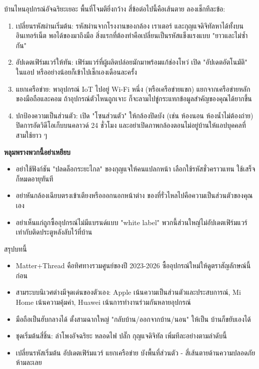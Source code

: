 
บ้านไหนอุปกรณ์อัจฉริยะเยอะ พื้นที่โจมตียิ่งกว้าง สี่ข้อต่อไปนี้คือเส้นตาย ลองเช็กทีละข้อ:

\begin{enumerate}
  \item เปลี่ยนรหัสผ่านเริ่มต้น: รหัสผ่านจากโรงงานของกล้อง เราเตอร์ และกุญแจดิจิทัลหาได้ทั้งบนอินเทอร์เน็ต พอได้ของมาถึงมือ สิ่งแรกที่ต้องทำคือเปลี่ยนเป็นรหัสแข็งแรงแบบ "ยาวและไม่ซ้ำกัน"
  \item อัปเดตเฟิร์มแวร์ให้ทัน: เฟิร์มแวร์ที่ผู้ผลิตปล่อยมักมาพร้อมแก้ช่องโหว่ เปิด "อัปเดตอัตโนมัติ" ในแอป หรืออย่างน้อยก็เข้าไปเช็กเองเดือนละครั้ง
  \item แยกเครือข่าย: พาอุปกรณ์ IoT ไปอยู่ Wi-Fi หนึ่ง (หรือเครือข่ายแขก) แยกจากเครือข่ายหลักของมือถือและคอม ถ้าอุปกรณ์ตัวไหนถูกเจาะ ก็จะลามไปขู่กระแทกข้อมูลสำคัญของคุณได้ยากขึ้น
  \item ปกป้องความเป็นส่วนตัว: เปิด "โซนส่วนตัว" ให้กล้องปิดบัง (เช่น ห้องนอน ห้องน้ำไม่ต้องถ่าย) ปิดการอัดวิดีโอเก็บบนคลาวด์ 24 ชั่วโมง และอย่าเปิดภาพกล้องตอนไม่อยู่บ้านให้แอปบุคคลที่สามใช้ยาว ๆ
\end{enumerate}

\textbf{หลุมพรางพวกนี้อย่าเหยียบ}\par

\begin{itemize}
  \item อย่าใช้ฟังก์ชัน "ปลดล็อกระยะไกล" ของกุญแจให้คนแปลกหน้า เลือกใช้รหัสชั่วคราวแทน ใช้เสร็จก็หมดอายุทันที
  \item อย่าหันกล้องเฉียบตรงเข้าเตียงหรือออกนอกหน้าต่าง ของที่รั่วไหลไปคือความเป็นส่วนตัวของคุณเอง
  \item อย่าเห็นแก่ถูกซื้ออุปกรณ์ไม่มีแบรนด์แบบ "white label" พวกนี้ส่วนใหญ่ไม่อัปเดตเฟิร์มแวร์ เท่ากับติดประตูหลังลับไว้ที่บ้าน
\end{itemize}

\begin{tcbsummary}{สรุปบทนี้}
\begin{itemize}
  \item Matter+Thread คือทิศทางรวมศูนย์ของปี 2023-2026 ซื้ออุปกรณ์ใหม่ให้ดูตราสัญลักษณ์นี้ก่อน
  \item สามระบบนิเวศต่างมีจุดเด่นของตัวเอง: Apple เน้นความเป็นส่วนตัวและประสบการณ์, Mi Home เน้นความคุ้มค่า, Huawei เน้นการทำงานร่วมกันหลายอุปกรณ์
  \item มือถือเป็นฮับกลางได้ ตั้งสามฉากใหญ่ "กลับบ้าน/ออกจากบ้าน/นอน" ให้เป็น บ้านก็ขยับเองได้
  \item ชุดเริ่มต้นสี่ชิ้น: ลำโพงอัจฉริยะ หลอดไฟ ปลั๊ก กุญแจดิจิทัล เพิ่มทีละอย่างตามลำดับนี้
  \item เปลี่ยนรหัสเริ่มต้น อัปเดตเฟิร์มแวร์ แยกเครือข่าย บังพื้นที่ส่วนตัว - สี่เส้นตายด้านความปลอดภัยห้ามละเลย
\end{itemize}

\end{tcbsummary}
